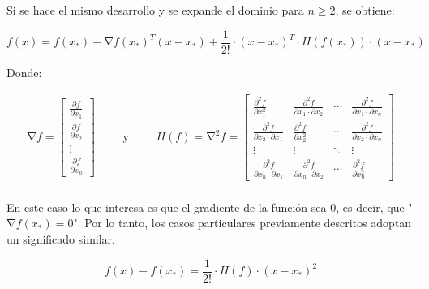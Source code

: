 Si se hace el mismo desarrollo y se expande el dominio para $n\geq{2}$, se obtiene:

\begin{equation*}
	f\left(x\right)=f\left(x_{*}\right)+\mathrm{\nabla}{f}{\left(x_{*}\right)}^{T}\left(x-x_{*}\right)+\frac{1}{2!}\cdot{\left(x-x_{*}\right)}^{T}\cdot{H}\left({f}\left(x_{*}\right)\right) 		\cdot\left(x-x_{*}\right)
\end{equation*}

Donde:

\begin{equation*}
	\begin{aligned}
		\mathrm{\nabla}{f}=
	\begin{bmatrix}
		\frac{\partial{f}}{\partial{x}_1} \\
		\frac{\partial{f}}{\partial{x}_2}  \\
		\vdots \\
		\frac{\partial{f}}{\partial{x}_n}
	\end{bmatrix}
	\end{aligned}
	\qquad\text{y}\qquad
	\begin{aligned}
	{H}\left(f\right)=\mathrm{\nabla}^{2}{f}= 	
	\begin{bmatrix}
		\frac{\partial^{2}{f}}{\partial{x}_{1}^{2}} & \frac{\partial^{2}{f}}{\partial{x}_{1}\cdot\partial{x}_{2}} & \cdots & \frac{\partial^{2}{f}}{\partial{x}_{1}\cdot\partial{x}_{n}}\\
		\frac{\partial^{2}{f}}{\partial{x}_{2}\cdot\partial{x}_{1}} & \frac{\partial^{2}{f}}{\partial{x}_{2}^{2}} & \cdots & \frac{\partial^{2}{f}}{\partial{x}_{2}\cdot\partial{x}_{n}}\\
		\vdots & \vdots & \ddots & \vdots\\
		\frac{\partial^{2}{f}}{\partial{x}_{n}\cdot\partial{x}_{1}} & \frac{\partial^{2}{f}}{\partial{x}_{n}\cdot\partial{x}_{2}} & \cdots & \frac{\partial^{2}{f}}{\partial{x}_{n}^{2}}
	\end{bmatrix}
	\end{aligned}
\end{equation*}\\

En este caso lo que interesa es que el gradiente de la función sea 0, es decir, que "$\mathrm{\nabla}{f}{\left(x_{*}\right)}=0$". Por lo tanto, los casos particulares previamente descritos adoptan un significado similar. 

\begin{equation*}
	f\left(x\right)-f\left(x_{*}\right)=\frac{1}{2!}\cdot{H}\left(f\right)\cdot\left(x-x_{*}\right)^2 
\end{equation*}


